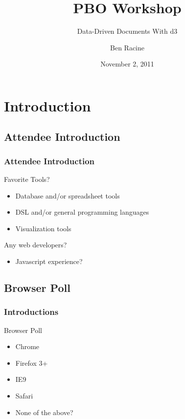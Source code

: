 \documentclass{beamer}
\title{PBO Workshop}
\subtitle{Data-Driven Documents With d3}
\author{Ben Racine \inst{1} }
\institute{\inst{1} Cornerstone Systems NW }
\date{November 2, 2011}
\begin{document}
\begin{frame}
    \frametitle{}
    \titlepage
\end{frame}





\section{Introduction}

\subsection{Attendee Introduction}

\begin{frame}
    \frametitle{Attendee Introduction}
\pause
    \begin{block}{Favorite Tools?} 
\pause
    \begin{itemize}
    \item Database and/or spreadsheet tools
\pause
    \item DSL and/or general programming languages
\pause
    \item Visualization tools
    \end{itemize}
    \end{block}
\pause
    \begin{block}{Any web developers?}
        \begin{itemize}
\pause
        \item Javascript experience?
        \end{itemize}
    \end{block}
\end{frame}


\subsection{Browser Poll}

\begin{frame}
    \frametitle{Introductions}
\pause
    \begin{block}{Browser Poll}
        \begin{itemize}
\pause
        \item Chrome
\pause
        \item Firefox 3+
\pause
        \item IE9
\pause
        \item Safari
\pause
        \item None of the above?
        \end{itemize}
    \end{block}
\end{frame}
\end{document}
